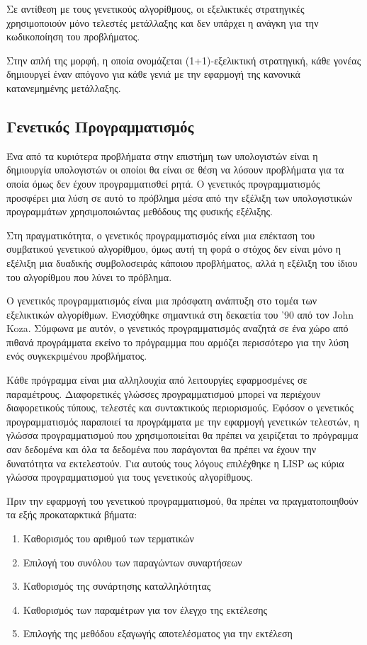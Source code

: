 Σε αντίθεση με τους γενετικούς αλγορίθμους, οι εξελικτικές στρατηγικές χρησιμοποιούν μόνο τελεστές μετάλλαξης και δεν υπάρχει η ανάγκη για την κωδικοποίηση του προβλήματος.

Στην απλή της μορφή, η οποία ονομάζεται (1+1)-εξελικτική στρατηγική, κάθε γονέας δημιουργεί έναν απόγονο για κάθε γενιά με την εφαρμογή της κανονικά κατανεμημένης μετάλλαξης.
\subsection{Γενετικός Προγραμματισμός}

Ένα από τα κυριότερα προβλήματα στην επιστήμη των υπολογιστών είναι η δημιουργία υπολογιστών οι οποίοι θα είναι σε θέση να λύσουν προβλήματα για τα οποία όμως δεν έχουν προγραμματισθεί ρητά. Ο γενετικός προγραμματισμός προσφέρει μια λύση σε αυτό το πρόβλημα μέσα από την εξέλιξη των υπολογιστικών προγραμμάτων χρησιμοποιώντας μεθόδους της φυσικής εξέλιξης.

Στη πραγματικότητα, ο γενετικός προγραμματισμός είναι μια επέκταση του συμβατικού γενετικού αλγορίθμου, όμως αυτή τη φορά ο στόχος δεν είναι μόνο η εξέλιξη μια δυαδικής συμβολοσειράς κάποιου προβλήματος, αλλά η εξέλιξη του ίδιου του αλγορίθμου που λύνει το πρόβλημα.

Ο γενετικός προγραμματισμός είναι μια πρόσφατη ανάπτυξη στο τομέα των εξελικτικών αλγορίθμων. Ενισχύθηκε σημαντικά στη δεκαετία του '90 από τον John Koza.
Σύμφωνα με αυτόν, ο γενετικός προγραμματισμός αναζητά σε ένα χώρο από πιθανά προγράμματα εκείνο το πρόγραμμμα που αρμόζει περισσότερο για την λύση ενός συγκεκριμένου προβλήματος.

Κάθε πρόγραμμα είναι μια αλληλουχία από λειτουργίες εφαρμοσμένες σε παραμέτρους. Διαφορετικές γλώσσες προγραμματισμού μπορεί να περιέχουν διαφορετικούς τύπους, τελεστές και συντακτικούς περιορισμούς. Εφόσον ο γενετικός προγραμματισμός παραποιεί τα προγράμματα με την εφαρμογή γενετικών τελεστών, η γλώσσα προγραμματισμού που χρησιμοποιείται θα πρέπει να χειρίζεται το πρόγραμμα σαν δεδομένα και όλα τα δεδομένα που παράγονται θα πρέπει να έχουν την δυνατότητα να εκτελεστούν. Για αυτούς τους λόγους επιλέχθηκε η LISP ως κύρια γλώσσα προγραμματισμού για τους γενετικούς αλγορίθμους.

Πριν την εφαρμογή του γενετικού προγραμματισμού, θα πρέπει να πραγματοποιηθούν τα εξής προκαταρκτικά βήματα:

\begin{enumerate}
  \item Καθορισμός του αριθμού των τερματικών
  \item Επιλογή του συνόλου των παραγώντων συναρτήσεων
  \item Καθορισμός της συνάρτησης καταλληλότητας
  \item Καθορισμός των παραμέτρων για τον έλεγχο της εκτέλεσης
  \item Επιλογής της μεθόδου εξαγωγής αποτελέσματος για την εκτέλεση
\end{enumerate}

